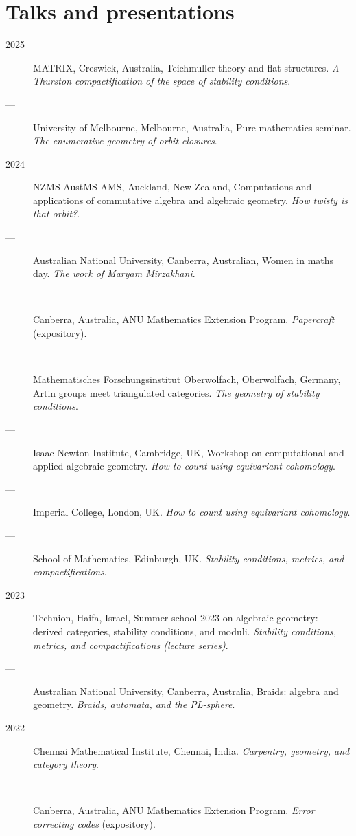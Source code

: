 \documentclass[11pt]{article}
\begin{document}
\section*{Talks and presentations}
\label{sec:orgcc3391d}
\label{orga0dc427}
\begin{description}
\item[{2025}] MATRIX, Creswick, Australia, Teichmuller theory and flat structures. \emph{A Thurston compactification of the space of stability conditions}.
\item[{---}] University of Melbourne, Melbourne, Australia, Pure mathematics seminar. \emph{The enumerative geometry of orbit closures}.
\item[{2024}] NZMS-AustMS-AMS, Auckland, New Zealand, Computations and applications of commutative algebra and algebraic geometry. \emph{How twisty is that orbit?}.
\item[{---}] Australian National University, Canberra, Australian, Women in maths day. \emph{The work of Maryam Mirzakhani}.
\item[{---}] Canberra, Australia, ANU Mathematics Extension Program. \emph{Papercraft} (expository).
\item[{---}] Mathematisches Forschungsinstitut Oberwolfach, Oberwolfach, Germany, Artin groups meet triangulated categories. \emph{The geometry of stability conditions}.
\item[{---}] Isaac Newton Institute, Cambridge, UK, Workshop on computational and applied algebraic geometry. \emph{How to count using equivariant cohomology}.
\item[{---}] Imperial College, London, UK. \emph{How to count using equivariant cohomology}.
\item[{---}] School of Mathematics, Edinburgh, UK. \emph{Stability conditions, metrics, and compactifications}.
\item[{2023}] Technion, Haifa, Israel, Summer school 2023 on algebraic geometry: derived categories, stability conditions, and moduli. \emph{Stability conditions, metrics, and compactifications (lecture series)}.
\item[{---}] Australian National University, Canberra, Australia, Braids: algebra and geometry. \emph{Braids, automata, and the PL-sphere}.
\item[{2022}] Chennai Mathematical Institute, Chennai, India. \emph{Carpentry, geometry, and category theory}.
\item[{---}] Canberra, Australia, ANU Mathematics Extension Program. \emph{Error correcting codes} (expository).

\end{description}
\end{document}
